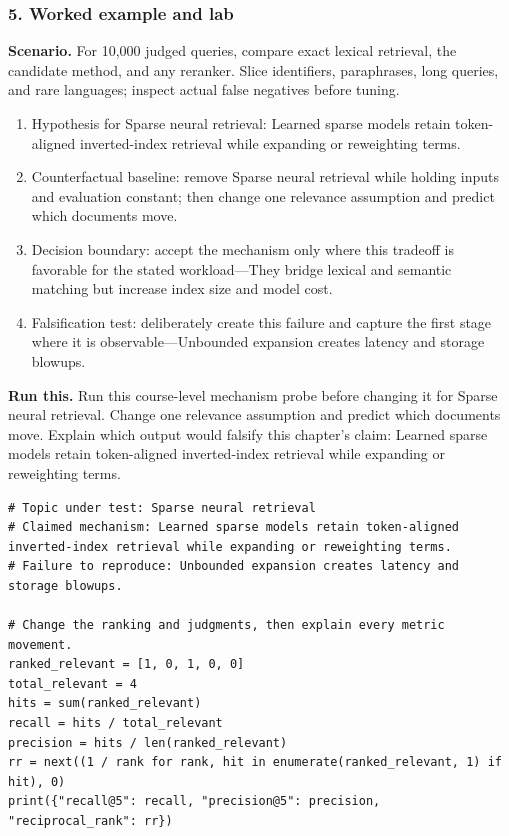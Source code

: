 \subsubsection*{5. Worked example and lab}
\textbf{Scenario.} For 10,000 judged queries, compare exact lexical retrieval, the candidate method, and any reranker. Slice identifiers, paraphrases, long queries, and rare languages; inspect actual false negatives before tuning.
\begin{enumerate}
\item Hypothesis for Sparse neural retrieval: Learned sparse models retain token-aligned inverted-index retrieval while expanding or reweighting terms.
\item Counterfactual baseline: remove Sparse neural retrieval while holding inputs and evaluation constant; then change one relevance assumption and predict which documents move.
\item Decision boundary: accept the mechanism only where this tradeoff is favorable for the stated workload—They bridge lexical and semantic matching but increase index size and model cost.
\item Falsification test: deliberately create this failure and capture the first stage where it is observable—Unbounded expansion creates latency and storage blowups.
\end{enumerate}
\textbf{Run this.} Run this course-level mechanism probe before changing it for Sparse neural retrieval. Change one relevance assumption and predict which documents move. Explain which output would falsify this chapter's claim: Learned sparse models retain token-aligned inverted-index retrieval while expanding or reweighting terms.
\begin{Verbatim}[fontsize=\scriptsize]
# Topic under test: Sparse neural retrieval
# Claimed mechanism: Learned sparse models retain token-aligned inverted-index retrieval while expanding or reweighting terms.
# Failure to reproduce: Unbounded expansion creates latency and storage blowups.

# Change the ranking and judgments, then explain every metric movement.
ranked_relevant = [1, 0, 1, 0, 0]
total_relevant = 4
hits = sum(ranked_relevant)
recall = hits / total_relevant
precision = hits / len(ranked_relevant)
rr = next((1 / rank for rank, hit in enumerate(ranked_relevant, 1) if hit), 0)
print({"recall@5": recall, "precision@5": precision, "reciprocal_rank": rr})
\end{Verbatim}
